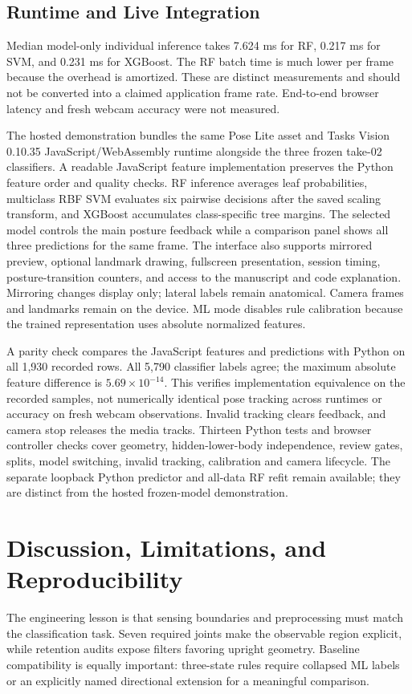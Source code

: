 \documentclass[conference]{IEEEtran}
\begin{document}
\subsection{Runtime and Live Integration}
Median model-only individual inference takes 7.624 ms for RF, 0.217 ms for SVM, and 0.231 ms for XGBoost. The RF batch time is much lower per frame because the overhead is amortized. These are distinct measurements and should not be converted into a claimed application frame rate. End-to-end browser latency and fresh webcam accuracy were not measured.

The hosted demonstration bundles the same Pose Lite asset and Tasks Vision 0.10.35 JavaScript/WebAssembly runtime alongside the three frozen take-02 classifiers. A readable JavaScript feature implementation preserves the Python feature order and quality checks. RF inference averages leaf probabilities, multiclass RBF SVM evaluates six pairwise decisions after the saved scaling transform, and XGBoost accumulates class-specific tree margins. The selected model controls the main posture feedback while a comparison panel shows all three predictions for the same frame. The interface also supports mirrored preview, optional landmark drawing, fullscreen presentation, session timing, posture-transition counters, and access to the manuscript and code explanation. Mirroring changes display only; lateral labels remain anatomical. Camera frames and landmarks remain on the device. ML mode disables rule calibration because the trained representation uses absolute normalized features.

A parity check compares the JavaScript features and predictions with Python on all 1,930 recorded rows. All 5,790 classifier labels agree; the maximum absolute feature difference is $5.69\times10^{-14}$. This verifies implementation equivalence on the recorded samples, not numerically identical pose tracking across runtimes or accuracy on fresh webcam observations. Invalid tracking clears feedback, and camera stop releases the media tracks. Thirteen Python tests and browser controller checks cover geometry, hidden-lower-body independence, review gates, splits, model switching, invalid tracking, calibration and camera lifecycle. The separate loopback Python predictor and all-data RF refit remain available; they are distinct from the hosted frozen-model demonstration.

\section{Discussion, Limitations, and Reproducibility}
The engineering lesson is that sensing boundaries and preprocessing must match the classification task. Seven required joints make the observable region explicit, while retention audits expose filters favoring upright geometry. Baseline compatibility is equally important: three-state rules require collapsed ML labels or an explicitly named directional extension for a meaningful comparison.
\end{document}
